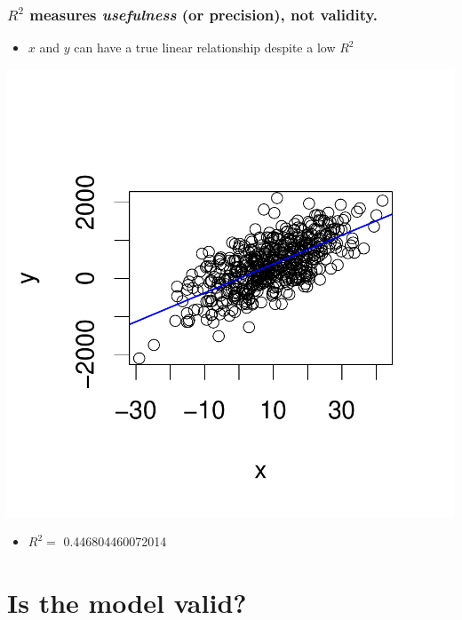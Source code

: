 \documentclass[handout]{beamer}
\numberwithin{equation}{section}
\begin{document}
\begin{frame}
\frametitle{\small $R^2$ measures \emph{usefulness} (or precision), not validity.}
\begin{center}
\begin{itemize}
\item $x$ and $y$ can have a true linear relationship despite a low $R^2$
\end{itemize}
\vspace{-4em}
\includegraphics{ch4part1-011}
\vspace{-2em}
\end{center}
\begin{itemize}
\item $R^2 = $ 0.446804460072014
\end{itemize}
\end{frame}



\section{Is the model valid?}
\end{document}
